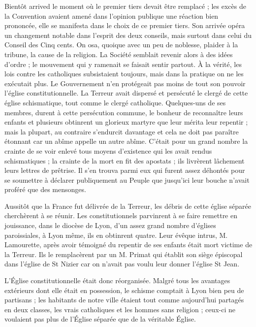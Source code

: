 \documentclass[11pt,a4paper]{report}
\begin{document}
Bientôt arrived le moment où le premier tiers devait être remplacé ; les excès de la Convention avaient amené dans l'opinion publique une réaction bien prononcée, elle se manifesta dans le choix de ce premier tiers. Son arrivée opéra un changement notable dans l'esprit des deux conseils, mais surtout dans celui du Conseil des Cinq cents. On osa, quoique avec un peu de noblesse, plaider à la tribune, la cause de la religion. La Société semblait revenir alors à des idées d'ordre ; le mouvement qui y ramenait se faisait sentir partout. À la vérité, les lois contre les catholiques subsistaient toujours, mais dans la pratique on ne les exécutait plus. Le Gouvernement n'en protégeait pas moins de tout son pouvoir l'église constitutionnelle. La Terreur avait dispersé et persécuté le clergé de cette église schismatique, tout comme le clergé catholique. Quelques-uns de ses membres, durent à cette persécution commune, le bonheur de reconnaître leurs enfants et plusieurs obtinrent un glorieux martyre que leur mérita leur repentir ; mais la plupart, au contraire s'endurcit davantage et cela ne doit pas paraître étonnant car un abîme appelle un autre abîme. C'était pour un grand nombre la crainte de se voir enlevé tous moyens d'existence qui les avait rendus schismatiques ; la crainte de la mort en fit des apostats ; ils livrèrent lâchement leurs lettres de prêtrise. Il s'en trouva parmi eux qui furent assez déhontés pour se soumettre à déclarer publiquement au Peuple que jusqu'ici leur bouche n'avait proféré que des mensonges.

Aussitôt que la France fut délivrée de la Terreur, les débris de cette église séparée cherchèrent à se réunir. Les constitutionnels parvinrent à se faire remettre en jouissance, dans le diocèse de Lyon, d'un assez grand nombre d'églises paroissiales, à Lyon même, ils en obtinrent quatre. Leur évêque intrus, M. Lamourette, après avoir témoigné du repentir de ses enfants était mort victime de la Terreur. Ils le remplacèrent par un M. Primat qui établit son siège épiscopal dans l'église de St Nizier car on n'avait pas voulu leur donner l'église St Jean.

L'Église constitutionnelle était donc réorganisée. Malgré tous les avantages extérieurs dont elle était en possession, le schisme comptait à Lyon bien peu de partisans ; les habitants de notre ville étaient tout comme aujourd'hui partagés en deux classes, les vrais catholiques et les hommes sans religion ; ceux-ci ne voulaient pas plus de l'Église séparée que de la véritable Église.
\end{document}
